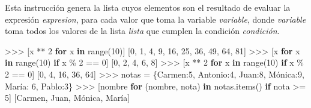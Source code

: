 \documentclass[
  spanish,
  a4paper,
]{scrreport}
\newenvironment{Shaded}{\begin{snugshade}}{\end{snugshade}}
\newcommand{\BuiltInTok}[1]{\textcolor[rgb]{0.00,0.23,0.31}{#1}}
\newcommand{\ControlFlowTok}[1]{\textcolor[rgb]{0.00,0.23,0.31}{\textbf{#1}}}
\newcommand{\DecValTok}[1]{\textcolor[rgb]{0.68,0.00,0.00}{#1}}
\newcommand{\KeywordTok}[1]{\textcolor[rgb]{0.00,0.23,0.31}{\textbf{#1}}}
\newcommand{\NormalTok}[1]{\textcolor[rgb]{0.00,0.23,0.31}{#1}}
\newcommand{\OperatorTok}[1]{\textcolor[rgb]{0.37,0.37,0.37}{#1}}
\newcommand{\StringTok}[1]{\textcolor[rgb]{0.13,0.47,0.30}{#1}}
\begin{document}
Esta instrucción genera la lista cuyos elementos son el resultado de
evaluar la expresión \emph{expresion}, para cada valor que toma la
variable \emph{variable}, donde \emph{variable} toma todos los valores
de la lista \emph{lista} que cumplen la condición \emph{condición}.

\begin{Shaded}
\begin{Highlighting}[]
\OperatorTok{\textgreater{}\textgreater{}\textgreater{}}\NormalTok{ [x }\OperatorTok{**} \DecValTok{2} \ControlFlowTok{for}\NormalTok{ x }\KeywordTok{in} \BuiltInTok{range}\NormalTok{(}\DecValTok{10}\NormalTok{)]}
\NormalTok{[}\DecValTok{0}\NormalTok{, }\DecValTok{1}\NormalTok{, }\DecValTok{4}\NormalTok{, }\DecValTok{9}\NormalTok{, }\DecValTok{16}\NormalTok{, }\DecValTok{25}\NormalTok{, }\DecValTok{36}\NormalTok{, }\DecValTok{49}\NormalTok{, }\DecValTok{64}\NormalTok{, }\DecValTok{81}\NormalTok{]}
\OperatorTok{\textgreater{}\textgreater{}\textgreater{}}\NormalTok{ [x }\ControlFlowTok{for}\NormalTok{ x }\KeywordTok{in} \BuiltInTok{range}\NormalTok{(}\DecValTok{10}\NormalTok{) }\ControlFlowTok{if}\NormalTok{ x }\OperatorTok{\%} \DecValTok{2} \OperatorTok{==} \DecValTok{0}\NormalTok{]}
\NormalTok{[}\DecValTok{0}\NormalTok{, }\DecValTok{2}\NormalTok{, }\DecValTok{4}\NormalTok{, }\DecValTok{6}\NormalTok{, }\DecValTok{8}\NormalTok{]}
\OperatorTok{\textgreater{}\textgreater{}\textgreater{}}\NormalTok{ [x }\OperatorTok{**} \DecValTok{2} \ControlFlowTok{for}\NormalTok{ x }\KeywordTok{in} \BuiltInTok{range}\NormalTok{(}\DecValTok{10}\NormalTok{) }\ControlFlowTok{if}\NormalTok{ x }\OperatorTok{\%} \DecValTok{2} \OperatorTok{==} \DecValTok{0}\NormalTok{]}
\NormalTok{[}\DecValTok{0}\NormalTok{, }\DecValTok{4}\NormalTok{, }\DecValTok{16}\NormalTok{, }\DecValTok{36}\NormalTok{, }\DecValTok{64}\NormalTok{]}
\OperatorTok{\textgreater{}\textgreater{}\textgreater{}}\NormalTok{ notas }\OperatorTok{=}\NormalTok{ \{}\StringTok{\textquotesingle{}Carmen\textquotesingle{}}\NormalTok{:}\DecValTok{5}\NormalTok{, }\StringTok{\textquotesingle{}Antonio\textquotesingle{}}\NormalTok{:}\DecValTok{4}\NormalTok{, }\StringTok{\textquotesingle{}Juan\textquotesingle{}}\NormalTok{:}\DecValTok{8}\NormalTok{, }\StringTok{\textquotesingle{}Mónica\textquotesingle{}}\NormalTok{:}\DecValTok{9}\NormalTok{, }\StringTok{\textquotesingle{}María\textquotesingle{}}\NormalTok{: }\DecValTok{6}\NormalTok{, }\StringTok{\textquotesingle{}Pablo\textquotesingle{}}\NormalTok{:}\DecValTok{3}\NormalTok{\}}
\OperatorTok{\textgreater{}\textgreater{}\textgreater{}}\NormalTok{ [nombre }\ControlFlowTok{for}\NormalTok{ (nombre, nota) }\KeywordTok{in}\NormalTok{ notas.items() }\ControlFlowTok{if}\NormalTok{ nota }\OperatorTok{\textgreater{}=} \DecValTok{5}\NormalTok{]}
\NormalTok{[}\StringTok{\textquotesingle{}Carmen\textquotesingle{}}\NormalTok{, }\StringTok{\textquotesingle{}Juan\textquotesingle{}}\NormalTok{, }\StringTok{\textquotesingle{}Mónica\textquotesingle{}}\NormalTok{, }\StringTok{\textquotesingle{}María\textquotesingle{}}\NormalTok{]}
\end{Highlighting}
\end{Shaded}
\end{document}

